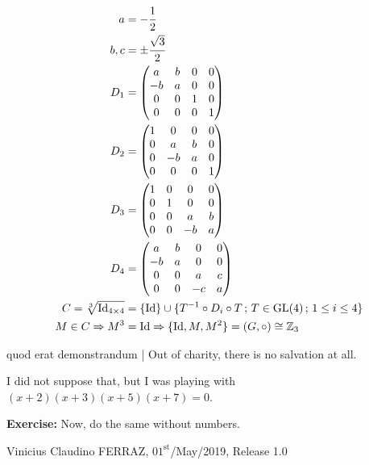 \documentclass[12pt,a4paper]{article}
\begin{document}
\begin{align}
a &= - \cfrac{1}{2} \\
b, c &= \pm \cfrac{\sqrt{3}}{2} \\
D_1 &= \left( \begin{matrix} a & b & 0 & 0 \\ -b & a & 0 & 0 \\ 0 & 0 & 1 & 0 \\ 0 & 0 & 0 & 1 \end{matrix} \right) \\
D_2 &= \left( \begin{matrix} 1 & 0 & 0 & 0 \\  0 & a & b & 0 \\ 0 &-b & a & 0 \\ 0 & 0 & 0 & 1 \end{matrix} \right) \\
D_3 &= \left( \begin{matrix} 1 & 0 & 0 & 0 \\  0 & 1 & 0 & 0 \\ 0 & 0 & a & b \\ 0 & 0 &-b & a \end{matrix} \right) \\
D_4 &= \left( \begin{matrix} a & b & 0 & 0 \\ -b & a & 0 & 0 \\ 0 & 0 & a & c \\ 0 & 0 &-c & a \end{matrix} \right) \\
C = \sqrt[3]{\text{Id}_{4 \times 4}} &= \{ \text{Id} \} \cup \{ T^{-1} \circ D_i \circ T\,;\,T \in \text{GL}(4)\,;\,1 \le i \le 4 \} \\
M \in C \Rightarrow M^3 &= \text{Id} \Rightarrow \{ \text{Id}, M, M^2 \} = (G, \circ) \cong \mathbb{Z}_3
\end{align}

\vspace{3mm}

quod erat demonstrandum | Out of charity, there is no salvation at all.

\vspace{3mm}

I did not suppose that, but I was playing with $(x + 2)(x + 3)(x + 5)(x + 7) = 0$.

\vspace{3mm}

\textbf{Exercise: } Now, do the same without numbers.

\vspace{3mm}

Vinicius Claudino FERRAZ, $01^{\text{st}}$/May/2019, Release 1.0
\end{document}
